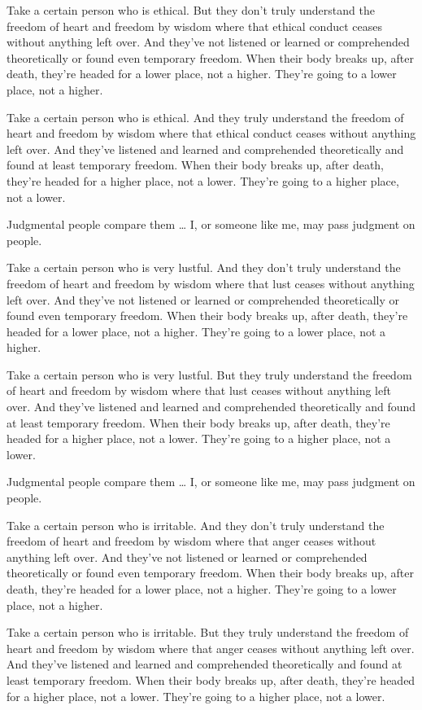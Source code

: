 \documentclass[12pt,openany]{book}%
\begin{document}
Take a certain person who is ethical. But they don’t truly understand the freedom of heart and freedom by wisdom where that ethical conduct ceases without anything left over. And they’ve not listened or learned or comprehended theoretically or found even temporary freedom. When their body breaks up, after death, they’re headed for a lower place, not a higher. They’re going to a lower place, not a higher. 

Take a certain person who is ethical. And they truly understand the freedom of heart and freedom by wisdom where that ethical conduct ceases without anything left over. And they’ve listened and learned and comprehended theoretically and found at least temporary freedom. When their body breaks up, after death, they’re headed for a higher place, not a lower. They’re going to a higher place, not a lower. 

Judgmental people compare them … I, or someone like me, may pass judgment on people. 

Take a certain person who is very lustful. And they don’t truly understand the freedom of heart and freedom by wisdom where that lust ceases without anything left over. And they’ve not listened or learned or comprehended theoretically or found even temporary freedom. When their body breaks up, after death, they’re headed for a lower place, not a higher. They’re going to a lower place, not a higher. 

Take a certain person who is very lustful. But they truly understand the freedom of heart and freedom by wisdom where that lust ceases without anything left over. And they’ve listened and learned and comprehended theoretically and found at least temporary freedom. When their body breaks up, after death, they’re headed for a higher place, not a lower. They’re going to a higher place, not a lower. 

Judgmental people compare them … I, or someone like me, may pass judgment on people. 

Take a certain person who is irritable. And they don’t truly understand the freedom of heart and freedom by wisdom where that anger ceases without anything left over. And they’ve not listened or learned or comprehended theoretically or found even temporary freedom. When their body breaks up, after death, they’re headed for a lower place, not a higher. They’re going to a lower place, not a higher. 

Take a certain person who is irritable. But they truly understand the freedom of heart and freedom by wisdom where that anger ceases without anything left over. And they’ve listened and learned and comprehended theoretically and found at least temporary freedom. When their body breaks up, after death, they’re headed for a higher place, not a lower. They’re going to a higher place, not a lower. 
\end{document}
